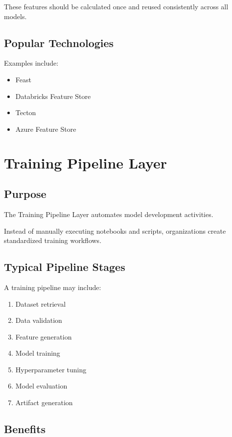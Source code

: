 These features should be calculated once and reused consistently across all models.

\subsection{Popular Technologies}

Examples include:

\begin{itemize}
    \item Feast
    \item Databricks Feature Store
    \item Tecton
    \item Azure Feature Store
\end{itemize}

\section{Training Pipeline Layer}

\subsection{Purpose}

The Training Pipeline Layer automates model development activities.

Instead of manually executing notebooks and scripts, organizations create standardized training workflows.

\subsection{Typical Pipeline Stages}

A training pipeline may include:

\begin{enumerate}
    \item Dataset retrieval
    \item Data validation
    \item Feature generation
    \item Model training
    \item Hyperparameter tuning
    \item Model evaluation
    \item Artifact generation
\end{enumerate}

\subsection{Benefits}

